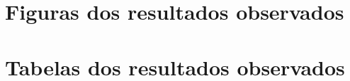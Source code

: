 \documentclass{article}
\begin{document}
\storeareas\normalsetting
{}
\recalctypearea

\section{Figuras dos resultados observados}
\label{sec:figures}









\section{Tabelas dos resultados observados}
\label{sec:tabelas}






\clearpage
\normalsetting
\end{document}
